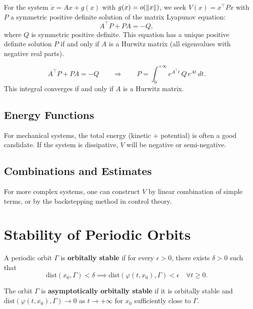 For the system $\dot{x} = Ax + g(x)$ with $g(x) = o(\left\| x \right\|)$, we seek
$V(x) = x^\top P x$ with $P$ a symmetric positive definite solution of the
matrix Lyapunov equation:
\[
    A^\top P + PA = -Q,
\]
where $Q$ is symmetric positive definite. This equation has a unique positive
definite solution $P$ if and only if $A$ is a Hurwitz matrix (all eigenvalues
with negative real parts).

\begin{keyformulas}[title=\textbf{Matrix Lyapunov equation}]
\[
    A^\top P + PA = -Q \qquad \Longrightarrow \qquad
    P = \int_0^{+\infty} e^{A^\top t}\, Q\, e^{At}\, dt.
\]
This integral converges if and only if $A$ is a Hurwitz matrix.
\end{keyformulas}

\subsection{Energy Functions}

For mechanical systems, the total energy (kinetic + potential) is often a good
candidate. If the system is dissipative, $\dot{V}$ will be negative or
semi-negative.

\subsection{Combinations and Estimates}

For more complex systems, one can construct $V$ by linear combination of
simple terms, or by the backstepping method in control theory.

\section{Stability of Periodic Orbits}

\begin{definition}
A periodic orbit $\Gamma$ is \textbf{orbitally stable} if for every
$\epsilon > 0$, there exists $\delta > 0$ such that
\[
    \mathrm{dist}(x_0, \Gamma) < \delta \implies
    \mathrm{dist}(\varphi(t, x_0), \Gamma) < \epsilon \quad \forall t \geq 0.
\]
\end{definition}

\begin{definition}
The orbit $\Gamma$ is \textbf{asymptotically orbitally stable} if it is
orbitally stable and
$\mathrm{dist}(\varphi(t, x_0), \Gamma) \to 0$ as $t \to +\infty$
for $x_0$ sufficiently close to $\Gamma$.
\end{definition}

